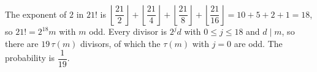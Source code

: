 The exponent of $2$ in $21!$ is $\left\lfloor\dfrac{21}{2}\right\rfloor+\left\lfloor\dfrac{21}{4}\right\rfloor+\left\lfloor\dfrac{21}{8}\right\rfloor+\left\lfloor\dfrac{21}{16}\right\rfloor=10+5+2+1=18$, so $21!=2^{18}m$ with $m$ odd. Every divisor is $2^jd$ with $0\le j\le18$ and $d\mid m$, so there are $19\,\tau(m)$ divisors, of which the $\tau(m)$ with $j=0$ are odd. The probability is $\boxed{\dfrac1{19}}$.
